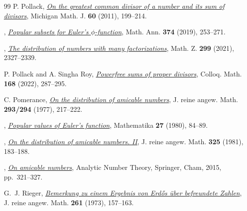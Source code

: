 \documentclass[11pt]{amsart}
\begin{document}
\begin{thebibliography}{99}
P. Pollack,
\href{https://www.pollack-math.net/combined3.pdf}{\emph{On the greatest common divisor of a number and its sum of divisors}},
Michigan Math. J. \textbf{60} (2011), 199--214.

\bysame,
\href{https://www.pollack-math.net/phicollapse8.pdf}{\emph{Popular subsets for Euler's $\phi$-function}},
Math. Ann. \textbf{374} (2019), 253--271.

\bysame,
\href{https://doi.org/10.1007/s00209-021-02762-2}
{\emph{The distribution of numbers with many factorizations}},
Math. Z. \textbf{299} (2021), 2327--2339.

P. Pollack and A. Singha Roy,
\href{https://doi.org/10.4064/cm8616-10-2021}{\emph{Powerfree sums of proper divisors}},
Colloq. Math. \textbf{168} (2022), 287--295.

C. Pomerance,
\href{https://math.dartmouth.edu/~carlp/Amicable1.pdf}{\emph{On the distribution of amicable numbers}},
J. reine angew. Math. \textbf{293/294} (1977), 217--222.

\bysame,
\href{https://math.dartmouth.edu/~carlp/popular.pdf}
{\emph{Popular values of Euler's function}},
Mathematika \textbf{27} (1980), 84--89.

\bysame,
\href{https://math.dartmouth.edu/~carlp/Amicable2.pdf}{\emph{On the distribution of amicable numbers. II}},
J. reine angew. Math. \textbf{325} (1981), 183--188.

\bysame,
\href{https://math.dartmouth.edu/~carlp/amicablesv3.pdf}{\emph{On amicable numbers}},
Analytic Number Theory, Springer, Cham, 2015, pp.~321--327.

G.~J. Rieger,
\href{https://doi.org/10.1515/crll.1973.261.157}{\emph{Bemerkung zu einem Ergebnis von Erd\H{o}s \"uber befreundete Zahlen}},
J. reine angew. Math. \textbf{261} (1973), 157--163.

\end{thebibliography}
    
    
\end{document}
